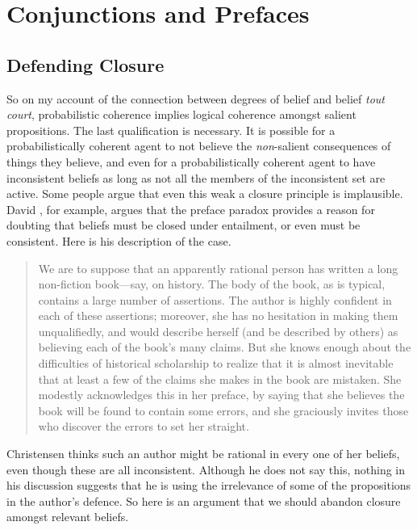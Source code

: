 \chapter{Conjunctions and Prefaces}

\section{Defending Closure}

So on my account of the connection between degrees of belief and belief \textit{tout court}, probabilistic coherence implies logical coherence amongst salient propositions. The last qualification is necessary. It is possible for a probabilistically coherent agent to not believe the \textit{non}{}-salient consequences of things they believe, and even for a probabilistically coherent agent to have inconsistent beliefs as long as not all the members of the inconsistent set are active. Some people argue that even this weak a closure principle is implausible. David \cite{Christensen2005}, for example, argues that the preface paradox provides a reason for doubting that beliefs must be closed under entailment, or even must be consistent. Here is his description of the case.

\begin{quote}
We are to suppose that an apparently rational person has written a long non-fiction book---say, on history. The body of the book, as is typical, contains a large number of assertions. The author is highly confident in each of these assertions; moreover, she has no hesitation in making them unqualifiedly, and would describe herself (and be described by others) as believing each of the book's many claims. But she knows enough about the difficulties of historical scholarship to realize that it is almost inevitable that at least a few of the claims she makes in the book are mistaken. She modestly acknowledges this in her preface, by saying that she believes the book will be found to contain some errors, and she graciously invites those who discover the errors to set her straight. \citep[33-4]{Christensen2005}
\end{quote}

\noindent Christensen thinks such an author might be rational in every one of her beliefs, even though these are all inconsistent. Although he does not say this, nothing in his discussion suggests that he is using the irrelevance of some of the propositions in the author's defence. So here is an argument that we should abandon closure amongst relevant beliefs.

